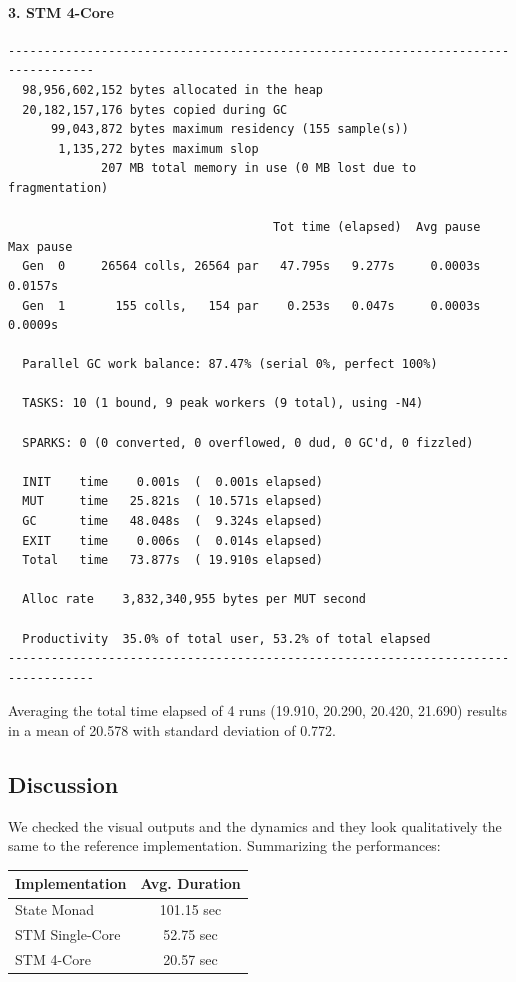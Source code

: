 \paragraph{3. STM 4-Core}
\begin{verbatim}
----------------------------------------------------------------------------------
  98,956,602,152 bytes allocated in the heap
  20,182,157,176 bytes copied during GC
      99,043,872 bytes maximum residency (155 sample(s))
       1,135,272 bytes maximum slop
             207 MB total memory in use (0 MB lost due to fragmentation)

                                     Tot time (elapsed)  Avg pause  Max pause
  Gen  0     26564 colls, 26564 par   47.795s   9.277s     0.0003s    0.0157s
  Gen  1       155 colls,   154 par    0.253s   0.047s     0.0003s    0.0009s

  Parallel GC work balance: 87.47% (serial 0%, perfect 100%)

  TASKS: 10 (1 bound, 9 peak workers (9 total), using -N4)

  SPARKS: 0 (0 converted, 0 overflowed, 0 dud, 0 GC'd, 0 fizzled)

  INIT    time    0.001s  (  0.001s elapsed)
  MUT     time   25.821s  ( 10.571s elapsed)
  GC      time   48.048s  (  9.324s elapsed)
  EXIT    time    0.006s  (  0.014s elapsed)
  Total   time   73.877s  ( 19.910s elapsed)

  Alloc rate    3,832,340,955 bytes per MUT second

  Productivity  35.0% of total user, 53.2% of total elapsed
----------------------------------------------------------------------------------
\end{verbatim}
 
Averaging the total time elapsed of 4 runs (19.910, 20.290, 20.420, 21.690) results in a mean of 20.578 with standard deviation of 0.772.

\subsection{Discussion}
We checked the visual outputs and the dynamics and they look qualitatively the same to the reference implementation. Summarizing the performances:
\begin{center}
  \begin{tabular}{ l || c }
    Implementation & Avg. Duration \\ \hline \hline 
    State Monad & 101.15 sec \\ \hline
   	STM Single-Core & 52.75 sec \\ \hline
   	STM 4-Core & 20.57 sec 
  \end{tabular}
\end{center}

